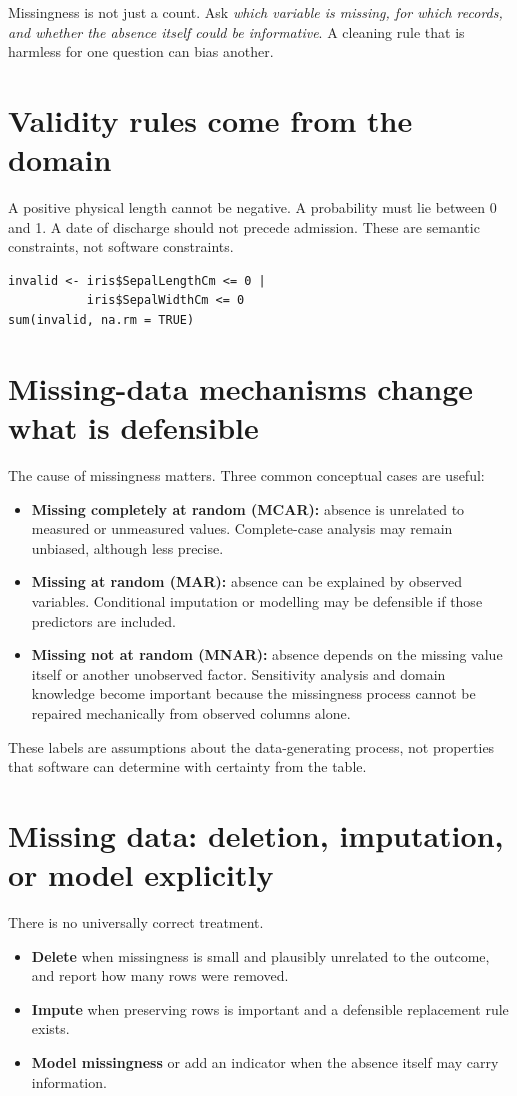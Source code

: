 Missingness is not just a count. Ask \emph{which variable is missing, for which records, and whether the absence itself could be informative}. A cleaning rule that is harmless for one question can bias another.

\section{Validity rules come from the domain}
A positive physical length cannot be negative. A probability must lie between 0 and 1. A date of discharge should not precede admission. These are semantic constraints, not software constraints.

\begin{lstlisting}[style=utpr]
invalid <- iris$SepalLengthCm <= 0 |
           iris$SepalWidthCm <= 0
sum(invalid, na.rm = TRUE)
\end{lstlisting}


\section{Missing-data mechanisms change what is defensible}
The cause of missingness matters. Three common conceptual cases are useful:
\begin{itemize}
  \item \textbf{Missing completely at random (MCAR):} absence is unrelated to measured or unmeasured values. Complete-case analysis may remain unbiased, although less precise.
  \item \textbf{Missing at random (MAR):} absence can be explained by observed variables. Conditional imputation or modelling may be defensible if those predictors are included.
  \item \textbf{Missing not at random (MNAR):} absence depends on the missing value itself or another unobserved factor. Sensitivity analysis and domain knowledge become important because the missingness process cannot be repaired mechanically from observed columns alone.
\end{itemize}
These labels are assumptions about the data-generating process, not properties that software can determine with certainty from the table.


\section{Missing data: deletion, imputation, or model explicitly}
There is no universally correct treatment.
\begin{itemize}
  \item \textbf{Delete} when missingness is small and plausibly unrelated to the outcome, and report how many rows were removed.
  \item \textbf{Impute} when preserving rows is important and a defensible replacement rule exists.
  \item \textbf{Model missingness} or add an indicator when the absence itself may carry information.
\end{itemize}

